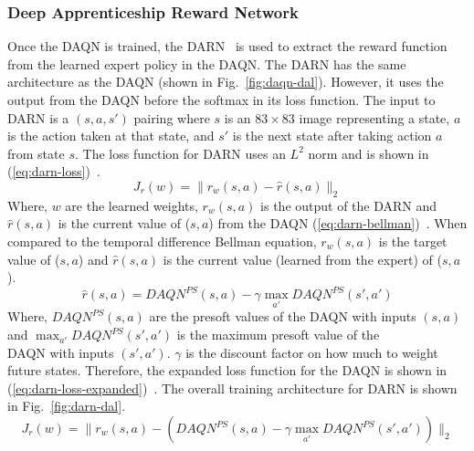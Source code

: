 \documentclass[12pt,american]{report}
\begin{document}
\subsubsection{Deep Apprenticeship Reward Network}
Once the DAQN is trained, the DARN~\cite{markovikj2014deep} is used to extract the reward function from the learned expert policy in the DAQN.  The DARN has the same architecture as the DAQN (shown in Fig.~\ref{fig:daqn-dal}). However, it uses the output from the DAQN before the softmax in its loss function.  The input to DARN is a $(s,a,s')$ pairing where $s$ is an $83\times 83$ image representing a state, $a$ is the action taken at that state, and $s'$ is the next state after taking action $a$ from state $s$. The loss function for DARN uses an $L^2$ norm and is shown in (\ref{eq:darn-loss})~\cite{markovikj2014deep}.
\begin{equation}
     \label{eq:darn-loss}
     J_r(w) =\|r_w(s,a) - \hat{r}(s,a) \|_2%
\end{equation}
Where, $w$ are the learned weights, $r_w(s,a)$ is the output of the DARN and $\hat{r}(s,a)$ is the current value of ($s,a$) from the DAQN (\ref{eq:darn-bellman})~\cite{markovikj2014deep}.  When compared to the temporal difference Bellman equation, $r_w(s,a)$ is the target value of ($s,a$) and $\hat{r}(s,a)$ is the current value (learned from the expert) of ($s,a$).
\begin{equation}
     \label{eq:darn-bellman}
     \hat{r}(s,a) = DAQN^{PS}(s,a) - \gamma \max_{a'}DAQN^{PS}(s',a')%
\end{equation}
Where, $DAQN^{PS}(s,a)$ are the presoft values of the DAQN with inputs $(s,a)$ and $\max_{a'}DAQN^{PS}(s',a')$ is the maximum presoft value of the \\DAQN with inputs $(s',a')$. $\gamma$ is the discount factor on how much to weight future states. Therefore, the expanded loss function for the DAQN is shown in (\ref{eq:darn-loss-expanded})~\cite{markovikj2014deep}. The overall training architecture for DARN is shown in Fig.~\ref{fig:darn-dal}.
\begin{equation}
     \label{eq:darn-loss-expanded}
     J_r(w) =\|r_w(s,a) - (DAQN^{PS}(s,a) - \gamma \max_{a'}DAQN^{PS}(s',a'))\|_2%
\end{equation}
\end{document}
